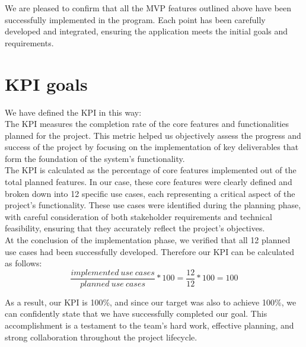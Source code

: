 \documentclass{article}
\begin{document}
We are pleased to confirm that all the MVP features outlined above have been successfully implemented in the program. Each point has been carefully developed and integrated, ensuring the application meets the initial goals and requirements.

\clearpage

\section{KPI goals}
We have defined the KPI in this way: \\
The KPI measures the completion rate of the core features and functionalities planned for the project.
This metric helped us objectively assess the progress and success of the project by focusing on the implementation of key deliverables that form the foundation of the system's functionality. \\
The KPI is calculated as the percentage of core features implemented out of the total planned features. In our case, these core features were clearly defined and broken down into 12 specific use cases, each representing a critical aspect of the project's functionality. These use cases were identified during the planning phase, with careful consideration of both stakeholder requirements and technical feasibility, ensuring that they accurately reflect the project's objectives. \\
At the conclusion of the implementation phase, we verified that all 12 planned use cases had been successfully developed. Therefore our KPI can be calculated as follows:
\[ \frac{implemented\ use\ cases}{planned\ use\ cases} * 100 = \frac{12}{12}*100 = 100 \]

As a result, our KPI is 100\%, and since our target was also to achieve 100\%, we can confidently state that we have successfully completed our goal. This accomplishment is a testament to the team's hard work, effective planning, and strong collaboration throughout the project lifecycle.
\end{document}
